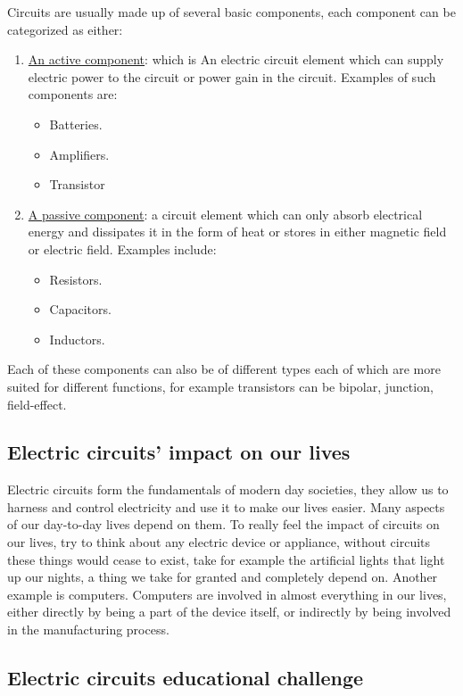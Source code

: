 \documentclass[../main.tex]{subfiles}
\begin{document}
Circuits are usually made up of several basic components, each component can be categorized as either: 
\begin{enumerate}
\item \underline{An active component}: which is An electric circuit element which can supply electric power to the circuit or power gain in the circuit. Examples of such components are:
\begin{itemize}
\item Batteries.
\item Amplifiers.
\item Transistor
\end{itemize}
\item \underline{A passive component}: a circuit element which can only absorb electrical energy and dissipates it in the form of heat or stores in either magnetic field or electric field. Examples include:
\begin{itemize}
    \item Resistors.
    \item Capacitors.
    \item Inductors.
\end{itemize}
\end{enumerate}
Each of these components can also be of different types each of which are more suited for different functions, for example transistors can be bipolar, junction, field-effect.



\subsection{Electric circuits’ impact on our lives}
Electric circuits form the fundamentals of modern day societies, they allow us to harness and control electricity and use it to make our lives easier. Many aspects of our day-to-day lives depend on them.
To really feel the impact of circuits on our lives, try to think about any electric device or appliance, without circuits these things would cease to exist, take for example the artificial lights that light up our nights, a thing we take for granted and completely depend on. Another example is computers. Computers are involved in almost everything in our lives, either directly by being a part of the device itself, or indirectly by being involved in the manufacturing process.



\subsection{Electric circuits educational challenge}
\end{document}
